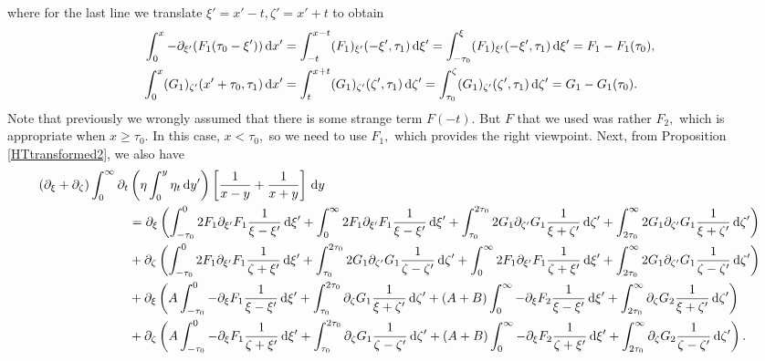 \documentclass[10pt,reqno,oneside,a4paper, landscape]{article}
\begin{document}
where for the last line we translate $\xi' = x'-t, \zeta' = x'+t$ to obtain
\begin{align*}
 \int^{x}_{0} -\partial_{\xi'}(F_1(\tau_0 - \xi')) \,\mathrm{d} x' &=  \int^{x-t}_{-t}(F_1)_{\xi'}(-\xi', \tau_1) \,\mathrm{d} \xi' =\int^{\xi}_{-\tau_0}(F_1)_{\xi'}(-\xi', \tau_1) \,\mathrm{d} \xi' = F_1 - F_1(\tau_0), \\
\int^{x}_{0} (G_1)_{\zeta'}(x'+\tau_0, \tau_1) \,\mathrm{d} x' &=  \int^{x+t}_{t}(G_1)_{\zeta'}(\zeta', \tau_1) \,\mathrm{d} \zeta' = \int^{\zeta}_{\tau_0}(G_1)_{\zeta'}(\zeta', \tau_1) \,\mathrm{d} \zeta' = G_1 - G_1(\tau_0).
\end{align*}
Note that previously we wrongly assumed that there is some strange term $F(-t).$ But $F$ that we used was rather $F_2,$ which is appropriate when $x \geq \tau_0.$ In this case, $x< \tau_0,$ so we need to use $F_1,$ which provides the right viewpoint. Next, from Proposition \ref{HTtransformed2}, we also have
\begin{align*}
(\partial_\xi + \partial_\zeta)\int_0^\infty \partial_t &\left( \eta \int^{y}_0\eta_{t} \,\mathrm{d} y' \right) \left[ \frac{1}{x-y} + \frac{1}{x+y} \right] \,\mathrm{d} y \\
&=\partial_\xi \left( \int^{0}_{-\tau_0} 2 F_1\partial_{\xi'}F_1  \frac{1}{\xi -\xi'} \,\mathrm{d} \xi' + \int_{0}^\infty 2 F_1\partial_{\xi'}F_1  \frac{1}{\xi -\xi'} \,\mathrm{d} \xi'  + \int_{\tau_0}^{2\tau_0} 2 G_1 \partial_{\zeta'} G_1 \frac{1}{\xi + \zeta'} \,\mathrm{d} \zeta' + \int_{2\tau_0}^{\infty}  2 G_1 \partial_{\zeta'} G_1 \frac{1}{\xi + \zeta'} \,\mathrm{d} \zeta'\right) \\
&+ \partial_{\zeta} \left(  \int^{0}_{-\tau_0} 2 F_1\partial_{\xi'}F_1 \frac{1}{\zeta +\xi'} \,\mathrm{d} \xi' + \int_{\tau_0}^{2\tau_0} 2 G_1 \partial_{\zeta'} G_1 \frac{1}{\zeta - \zeta'} \,\mathrm{d} \zeta' + \int_{0}^\infty 2 F_1\partial_{\xi'}F_1 \frac{1}{\zeta +\xi'} \,\mathrm{d} \xi' + \int_{2\tau_0}^{\infty}  2 G_1 \partial_{\zeta'} G_1 \frac{1}{\zeta - \zeta'} \,\mathrm{d} \zeta' \right) \\
&+ \partial_\xi \left( A \int^0_{-\tau_0} -\partial_\xi F_1 \frac{1}{\xi - \xi'} \,\mathrm{d} \xi' + \int^{2\tau_0}_{\tau_0} \partial_\zeta G_1 \frac{1}{\xi + \zeta'} \,\mathrm{d} \zeta' + (A+B)\int_0^{\infty} -\partial_\xi F_2 \frac{1}{\xi - \xi'} \,\mathrm{d} \xi' + \int_{2\tau_0}^{\infty} \partial_\zeta G_2 \frac{1}{\xi + \zeta'} \,\mathrm{d} \zeta' \right) \\
&+ \partial_\zeta \left( A \int^0_{-\tau_0} -\partial_\xi F_1  \frac{1}{\zeta + \xi'}  \,\mathrm{d} \xi' + \int^{2\tau_0}_{\tau_0} \partial_\zeta G_1 \frac{1}{\zeta - \zeta'} \,\mathrm{d} \zeta' + (A+B) \int_0^{\infty} -\partial_\xi F_2  \frac{1}{\zeta + \xi'} \,\mathrm{d} \xi'  + \int_{2\tau_0}^{\infty} \partial_\zeta G_2 \frac{1}{\zeta - \zeta'}\,\mathrm{d} \zeta'  \right).
\end{align*}
\end{document}
